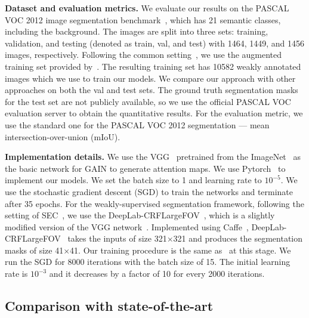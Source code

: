 \documentclass[10pt,twocolumn,letterpaper]{article}
\begin{document}
\textbf{Dataset and evaluation metrics.} We evaluate our results on the PASCAL VOC 2012 image segmentation benchmark~\cite{everingham2010pascal}, which has 21 semantic classes, including the background. The images are split into three sets: training, validation, and testing (denoted as train, val, and test) with 1464, 1449, and 1456 images, respectively. Following the common setting~\cite{chen14semantic,kolesnikov2016seed}, we use the augmented training set provided by~\cite{hariharan2011semantic}. The resulting training set has 10582 weakly annotated images which we use to train our models. We compare our approach with other approaches on both the val and test sets. The ground truth segmentation masks for the test set are not publicly available, so we use the official PASCAL VOC evaluation server to obtain the quantitative results. For the evaluation metric, we use the standard one for the PASCAL VOC 2012 segmentation --- mean intersection-over-union (mIoU).



\textbf{Implementation details.} We use the VGG~\cite{simonyan2014very} pretrained from the ImageNet~\cite{deng2009imagenet} as the basic network for GAIN to generate attention maps. We use Pytorch~\cite{Pytorch} to implement our models. We set the batch size to 1 and learning rate to ${10^{ - 5}}$. We use the stochastic gradient descent (SGD) to train the networks and terminate after 35 epochs. For the weakly-supervised segmentation framework, following the setting of SEC~\cite{kolesnikov2016seed}, we use the DeepLab-CRFLargeFOV~\cite{chen14semantic}, which is a slightly modified version of the VGG network~\cite{simonyan2014very}. Implemented using Caffe~\cite{jia2014caffe}, DeepLab-CRFLargeFOV~\cite{chen14semantic} takes the inputs of size 321$\times$321 and produces the segmentation masks of size 41$\times$41. Our training procedure is the same as~\cite{kolesnikov2016seed} at this stage. We run the SGD for 8000 iterations with the batch size of 15. The initial learning rate is ${10^{ - 3}}$ and it decreases by a factor of 10 for every 2000 iterations. %



\subsection{Comparison with state-of-the-art} \label{sc:Experiment_comparisons}
\end{document}
